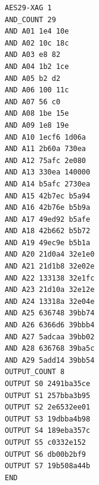 \begin{lstlisting}[language=bash,caption={Normalized 29-AND XAG certificate.},label={lst:xag}]
AES29-XAG 1
AND_COUNT 29
AND A01 1e4 10e
AND A02 10c 18c
AND A03 e8 82
AND A04 1b2 1ce
AND A05 b2 d2
AND A06 100 11c
AND A07 56 c0
AND A08 1be 15e
AND A09 1e8 19e
AND A10 1ecf6 1d06a
AND A11 2b60a 730ea
AND A12 75afc 2e080
AND A13 330ea 140000
AND A14 b5afc 2730ea
AND A15 42b7ec b5a94
AND A16 42b76e b5b9a
AND A17 49ed92 b5afe
AND A18 42b662 b5b72
AND A19 49ec9e b5b1a
AND A20 21d0a4 32e1e0
AND A21 21d1b8 32e02e
AND A22 133138 32e1fc
AND A23 21d10a 32e12e
AND A24 13318a 32e04e
AND A25 636748 39bb74
AND A26 6366d6 39bbb4
AND A27 5adcaa 39bb02
AND A28 636768 39ba5c
AND A29 5add14 39bb54
OUTPUT_COUNT 8
OUTPUT S0 2491ba35ce
OUTPUT S1 257bba3b95
OUTPUT S2 2e6532ee01
OUTPUT S3 19dbba4b98
OUTPUT S4 189eba357c
OUTPUT S5 c0332e152
OUTPUT S6 db00b2bf9
OUTPUT S7 19b508a44b
END
\end{lstlisting}
